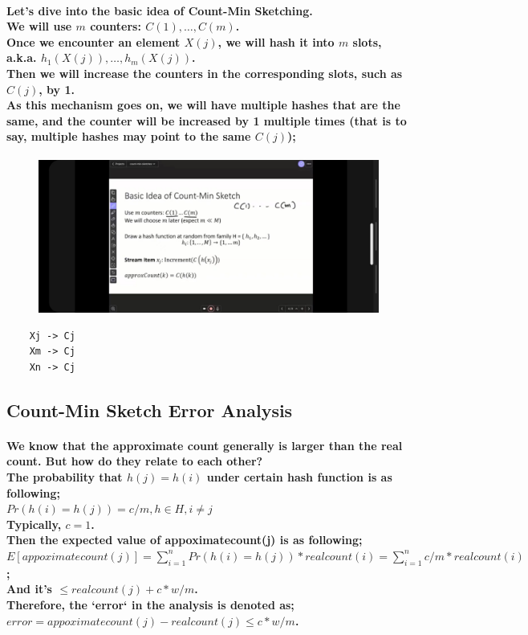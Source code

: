 \documentclass{article}
\begin{document}
\paragraph{
    Let's dive into the basic idea of Count-Min Sketching.\\
    We will use $m$ counters: $C(1), \ldots, C(m)$.\\
    Once we encounter an element $X(j)$, we will hash it into $m$ slots, a.k.a. $h_1(X(j)), \ldots, h_m(X(j))$.\\
    Then we will increase the counters in the corresponding slots, such as $C(j)$, by 1.\\
    As this mechanism goes on, we will have multiple hashes that are the same, and the counter will be increased by 1 multiple times
    (that is to say, multiple hashes may point to the same $C(j)$);\\
}

\begin{figure}[H]
    \includegraphics[width=\textwidth]{countminsketchbasicidea.jpg}
\end{figure}

\begin{verbatim}
    Xj -> Cj
    Xm -> Cj
    Xn -> Cj
\end{verbatim}

\subsection{Count-Min Sketch Error Analysis}

\paragraph{
    We know that the approximate count generally is larger than the real count. But how do they relate to each other?\\
    The probability that $h(j) = h(i)$ under certain hash function is as following;\\
    $Pr(h(i)=h(j)) = c/m, h \in H, i \neq j$\\
    Typically, $c=1$.\\
    Then the expected value of appoximatecount(j) is as following;\\
    $E[appoximatecount(j)] = \sum_{i=1}^n Pr(h(i)=h(j)) * realcount(i) = \sum_{i=1}^n c/m * realcount(i)$;\\
    And it's $\leq realcount(j) + c*w/m$.\\
    Therefore, the `error` in the analysis is denoted as;\\
    $error = appoximatecount(j) - realcount(j) \leq c*w/m$.\\
}
\end{document}
